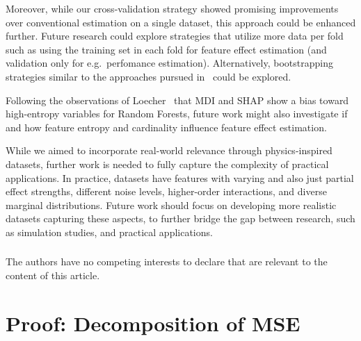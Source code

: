 \documentclass[runningheads]{llncs}
\begin{document}
Moreover, while our cross-validation strategy showed promising improvements over
conventional estimation on a single dataset, this approach could be enhanced further.
Future research could explore strategies that utilize more data per fold such as using the
training set in each fold for feature effect estimation (and validation only for e.g.\ perfomance estimation).
Alternatively, bootstrapping strategies similar to the approaches pursued in~\cite{molnar_relating_2023} could be
explored.

Following the observations of Loecher~\cite{loecher_debiasing_2024} that MDI and SHAP show
a bias toward high-entropy variables for Random Forests, future work might also investigate if and how
feature entropy and cardinality influence feature effect estimation.

While we aimed to incorporate real-world relevance through physics-inspired datasets, further
work is needed to fully capture the complexity of practical applications. In practice, datasets
have features with varying and also just partial effect strengths, different noise levels,
higher-order interactions, and diverse marginal distributions. Future work should focus on
developing more realistic datasets capturing these aspects, to further bridge the gap between
research, such as simulation studies, and practical applications.

\begin{credits}
    \subsubsection{\discintname}
    The authors have no competing interests to declare that are relevant to the
    content of this article.
\end{credits}

%



\newpage
\appendix
\section{Proof: Decomposition of MSE}\label{app:proof-mse-decomposition}
\end{document}
